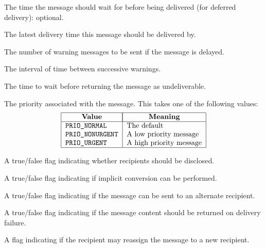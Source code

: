 \begin{describe}

\item[\verb|defertime|:]	The time the message should wait for
before being delivered (for deferred delivery): optional.

\item[\verb|latest\_time|:]	The latest delivery time this message
should be delivered by.

\item[\verb|nwarns|:]	The number of warning messages to be sent if
the message is delayed.

\item[\verb|warninterval|:]	The interval of time between
successive warnings.

\item[\verb|retinterval|:]	The time to wait before returning the
message as undeliverable.


\item[\verb|priority|:]		The priority associated with the
message. This takes one of the following values:
\[\begin{tabular}{|l|l|}
\hline
	\multicolumn{1}{|c|}{\bf Value}&
		\multicolumn{1}{|c|}{\bf Meaning}\\
\hline
	\tt PRIO\_NORMAL&	The default\\
	\tt PRIO\_NONURGENT&	A low priority message\\
	\tt PRIO\_URGENT&	A high priority message\\
\hline
\end{tabular}\]

\item[\verb|disclose\_recips|:]	A true/false flag indicating whether
recipients should be disclosed.

\item[\verb|implicit\_conversion|:]	A true/false flag indicating
if implicit conversion can be performed.

\item[\verb|alternate\_recip\_allowed|:]	A true/false flag indicating
if the message can be sent to an alternate recipient.

\item[\verb|content\_return\_request|:]	A true/false flag indicating
if the message content should be returned on delivery failure.

\item[\verb|recip\_reassign\_prohibited|:] A flag indicating if the
recipient may reassign the message to a new recipient.


\end{describe}
